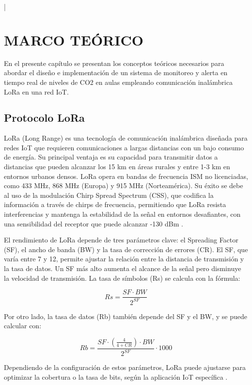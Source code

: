 |\chapter{MARCO TEÓRICO}

En el presente capítulo se presentan los conceptos teóricos necesarios para abordar el diseño e implementación de un sistema de monitoreo y alerta en tiempo real de niveles de CO2 en aulas empleando comunicación inalámbrica LoRa en una red IoT.

\section{Protocolo LoRa}
LoRa (Long Range) es una tecnología de comunicación inalámbrica diseñada para redes IoT que requieren comunicaciones a largas distancias con un bajo consumo de energía. Su principal ventaja es su capacidad para transmitir datos a distancias que pueden alcanzar los 15 km en áreas rurales y entre 1-3 km en entornos urbanos densos. LoRa opera en bandas de frecuencia ISM no licenciadas, como 433 MHz, 868 MHz (Europa) y 915 MHz (Norteamérica). Su éxito se debe al uso de la modulación Chirp Spread Spectrum (CSS), que codifica la información a través de chirps de frecuencia, permitiendo que LoRa resista interferencias y mantenga la estabilidad de la señal en entornos desafiantes, con una sensibilidad del receptor que puede alcanzar -130 dBm \cite{A_Study_of_LoRa_Long_Range_and_Low_Power_Networks_for_the_Internet_of_Things}.

El rendimiento de LoRa depende de tres parámetros clave: el Spreading Factor (SF), el ancho de banda (BW) y la tasa de corrección de errores (CR). El SF, que varía entre 7 y 12, permite ajustar la relación entre la distancia de transmisión y la tasa de datos. Un SF más alto aumenta el alcance de la señal pero disminuye la velocidad de transmisión. La tasa de símbolos (Rs) se calcula con la fórmula:

\begin{equation}\label{eq
	} Rs = \frac{SF \cdot BW}{2^{SF}} \end{equation}

Por otro lado, la tasa de datos (Rb) también depende del SF y el BW, y se puede calcular con:

\begin{equation}\label{eq
	} Rb = \frac{SF \cdot \left( \frac{4}{4+CR} \right) \cdot BW}{2^{SF}} \cdot 1000 \end{equation}

Dependiendo de la configuración de estos parámetros, LoRa puede ajustarse para optimizar la cobertura o la tasa de bits, según la aplicación IoT específica \cite{A_Survey_of_LoRaWAN_for_IoT_From_Technology_to_Application}.


